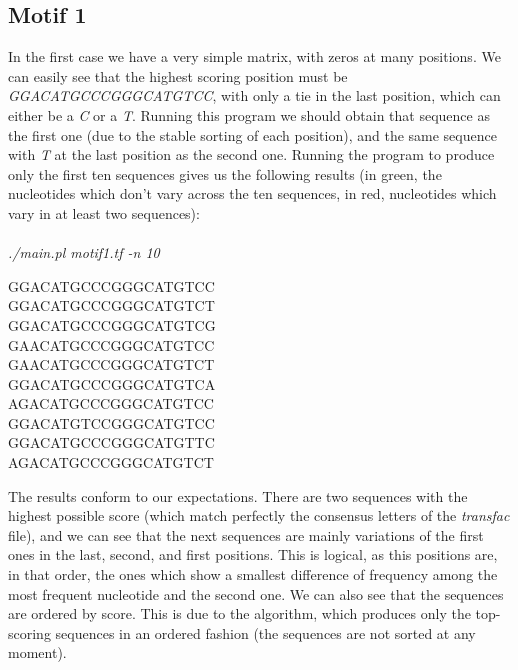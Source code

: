 \documentclass{article}
\newcommand{\spaces}{\space\space\space\space\space\space}
\newcommand{\g}[1]{\textcolor[rgb]{0,0.6,0}{#1}}
\newcommand{\re}[1]{\textcolor[rgb]{0.6,0,0}{#1}}
\begin{document}
\subsection{Motif 1}

In the first case we have a very simple matrix, with zeros at many positions. We can easily see that the highest scoring position must be \emph{GGACATGCCCGGGCATGTCC}, with only a tie in the last position, which can either be a \emph{C} or a \emph{T}. Running this program we should obtain that sequence as the first one (due to the stable sorting of each position), and the same sequence with \emph{T} at the last position as the second one. Running the program to produce only the first ten sequences gives us the following results (in green, the nucleotides which don't vary across the ten sequences, in red, nucleotides which vary in at least two sequences):\\\\
\emph{./main.pl motif1.tf -n 10}
\begin{center}
\re{GG}\g{ACATG}C\g{CCGGGCATGT}C\re{C}\spaces307\\
\re{GG}\g{ACATG}C\g{CCGGGCATGT}C\re{T}\spaces307\\
\re{GG}\g{ACATG}C\g{CCGGGCATGT}C\re{G}\spaces302\\
\re{GA}\g{ACATG}C\g{CCGGGCATGT}C\re{C}\spaces300\\
\re{GA}\g{ACATG}C\g{CCGGGCATGT}C\re{T}\spaces300\\
\re{GG}\g{ACATG}C\g{CCGGGCATGT}C\re{A}\spaces300\\
\re{AG}\g{ACATG}C\g{CCGGGCATGT}C\re{C}\spaces298\\
\re{GG}\g{ACATG}T\g{CCGGGCATGT}C\re{C}\spaces298\\
\re{GG}\g{ACATG}C\g{CCGGGCATGT}T\re{C}\spaces298\\
\re{AG}\g{ACATG}C\g{CCGGGCATGT}C\re{T}\spaces298\\
\end{center}

The results conform to our expectations. There are two sequences with the highest possible score (which match perfectly the consensus letters of the \emph{transfac} file), and we can see that the next sequences are mainly variations of the first ones in the last, second, and first positions. This is logical, as this positions are, in that order, the ones which show a smallest difference of frequency among the most frequent nucleotide and the second one. We can also see that the sequences are ordered by score. This is due to the algorithm, which produces only the top-scoring sequences in an ordered fashion (the sequences are not sorted at any moment).
\end{document}
